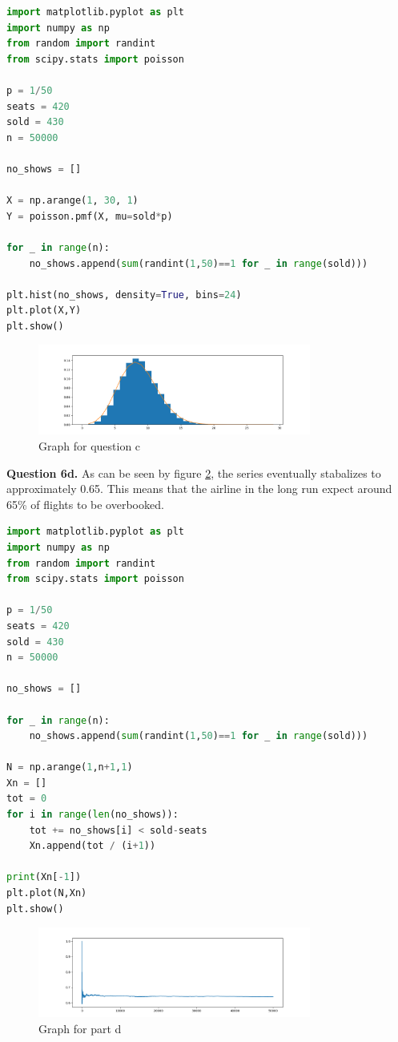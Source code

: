 \documentclass[letterpaper, reqno,11pt]{article}
\begin{document}
\begin{lstlisting}[language=Python]
import matplotlib.pyplot as plt 
import numpy as np
from random import randint
from scipy.stats import poisson

p = 1/50
seats = 420
sold = 430
n = 50000

no_shows = []

X = np.arange(1, 30, 1)
Y = poisson.pmf(X, mu=sold*p)

for _ in range(n):
    no_shows.append(sum(randint(1,50)==1 for _ in range(sold)))

plt.hist(no_shows, density=True, bins=24)
plt.plot(X,Y)
plt.show()
\end{lstlisting}

\begin{figure}[htpb]
    \centering
    \includegraphics[width=0.8\textwidth]{c}
    \caption{Graph for question c}
    \label{fig:c}
\end{figure}

{\medskip\noindent\bf Question 6d.} As can be seen by figure \ref{fig:d}, the series eventually stabalizes to approximately 0.65. This means that the airline in the long run expect around 65\% of flights to be overbooked. 

\begin{lstlisting}[language=Python]
import matplotlib.pyplot as plt 
import numpy as np
from random import randint
from scipy.stats import poisson

p = 1/50
seats = 420
sold = 430
n = 50000

no_shows = []

for _ in range(n):
    no_shows.append(sum(randint(1,50)==1 for _ in range(sold)))

N = np.arange(1,n+1,1)
Xn = []
tot = 0
for i in range(len(no_shows)):
    tot += no_shows[i] < sold-seats
    Xn.append(tot / (i+1))

print(Xn[-1])
plt.plot(N,Xn)
plt.show()
\end{lstlisting}


\begin{figure}[htpb]
    \centering
    \includegraphics[width=0.8\textwidth]{d}
    \caption{Graph for part d}
    \label{fig:d}
\end{figure}

\end{document}

